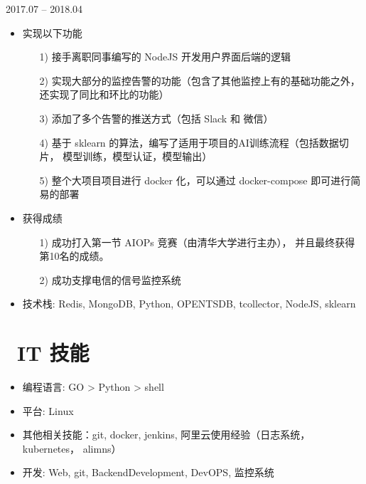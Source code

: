 \documentclass{resume}
\begin{document}
 {2017.07 -- 2018.04}
\newline
{}
\begin{onehalfspacing}
\begin{itemize}
  \item 实现以下功能
  \begin{itemize}
    \item [1)]
     接手离职同事编写的 NodeJS 开发用户界面后端的逻辑
    \item [2)]
      实现大部分的监控告警的功能（包含了其他监控上有的基础功能之外，还实现了同比和环比的功能）
    \item [3)]
      添加了多个告警的推送方式（包括 Slack 和 微信）
    \item [4)]
      基于 sklearn 的算法，编写了适用于项目的AI训练流程（包括数据切片， 模型训练，模型认证，模型输出）
    \item [5)]
      整个大项目项目进行 docker 化，可以通过 docker-compose 即可进行简易的部署 
  \end{itemize}
  \item 获得成绩
  \begin{itemize}
    \item [1)]成功打入第一节 AIOPs 竞赛（由清华大学进行主办）， 并且最终获得第10名的成绩。
    \item [2)]成功支撑电信的信号监控系统
  \end{itemize}
  \item 技术栈: Redis, MongoDB, Python, OPENTSDB, tcollector, NodeJS, sklearn
\end{itemize}
\end{onehalfspacing}


\section{\faCogs\ IT 技能}
\begin{itemize}[parsep=0.5ex]
  \item 编程语言: GO > Python > shell 
  \item 平台: Linux
  \item 其他相关技能：git, docker, jenkins, 阿里云使用经验（日志系统，kubernetes， alimns）
  \item 开发: Web, git, BackendDevelopment, DevOPS, 监控系统
\end{itemize}
\end{document}
